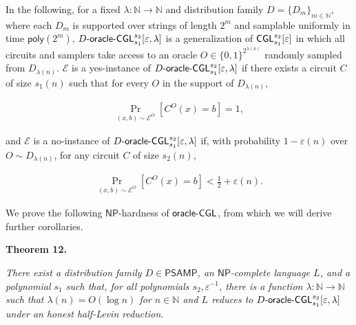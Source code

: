 In the following, for a fixed $\lambda:\mathbb{N}\to\mathbb{N}$ and distribution family $D=\{D_{m}\}_{m\in\mathbb{N}}$, where each $D_{m}$ is supported over strings of length $2^{m}$ and samplable uniformly in time ${\mathsf{poly}}(2^{m})$, $D\text{-}{\sf oracle}\text{-}{\sf CGL}_{s_{1}}^{s_{2}}[\varepsilon,\lambda]$ is a generalization of ${\sf CGL}_{s_{1}}^{s_{2}}[\varepsilon]$ in which all circuits and samplers take access to an oracle $O\in\{0,1\}^{2^{\lambda(n)}}$ randomly sampled from $D_{\lambda(n)}$. $\mathcal{E}$ is a yes-instance of $D\text{-}{\sf oracle}\text{-}{\sf CGL}_{s_{1}}^{s_{2}}[\varepsilon,\lambda]$ if there exists a circuit $C$ of size $s_{1}(n)$ such that for every $O$ in the support of $D_{\lambda(n)}$,\par


\[\begin{gathered}
\Pr_{(x,b)\sim\mathcal{E}^{O}}[C^{O}(x)=b]=1,
\end{gathered}\]


and $\mathcal{E}$ is a no-instance of $D\text{-}{\sf oracle}\text{-}{\sf CGL}_{s_{1}}^{s_{2}}[\varepsilon,\lambda]$ if, with probability $1-\varepsilon(n)$ over $O\sim D_{\lambda(n)}$, for any circuit $C$ of size $s_{2}(n)$,\par


\[\begin{gathered}
\Pr_{(x,b)\sim\mathcal{E}^{O}}[C^{O}(x)=b]<\frac{1}{2}+\varepsilon(n).
\end{gathered}\]




We prove the following ${\mathsf{NP}}$-hardness of ${\sf oracle}\text{-}{\sf CGL}$, from which we will derive further corollaries.\par





\par\medskip\noindent\textbf{
\textbf{Theorem 12}\textbf{.}
}\par



\emph{There exist a distribution family $D\in{\mathsf{P}}{\mathsf{SAMP}}$, an ${\mathsf{NP}}$-complete language $L$, and a polynomial $s_{1}$ such that, for all polynomials $s_{2},\varepsilon^{-1}$, there is a function $\lambda:\mathbb{N}\to\mathbb{N}$ such that $\lambda(n)=O(\log n)$ for $n\in\mathbb{N}$ and $L$ reduces to $D\text{-}{\sf oracle}\text{-}{\sf CGL}^{s_{2}}_{s_{1}}[\varepsilon,\lambda]$ under an honest half-Levin reduction.}\par



